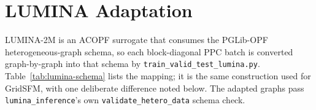 \documentclass[10pt]{article}
\begin{document}
\begin{table}[h!]
\centering
\caption{SimBench raw-parquet baseline metrics, complex128 residual evaluation.}
\label{tab:simbench-baseline}
\small
{}
\end{table}

\section*{LUMINA Adaptation}
LUMINA-2M is an ACOPF surrogate that consumes the PGLib-OPF heterogeneous-graph schema, so each block-diagonal PPC batch is converted graph-by-graph into that schema by \texttt{train\_valid\_test\_lumina.py}. Table~\ref{tab:lumina-schema} lists the mapping; it is the same construction used for GridSFM, with one deliberate difference noted below. The adapted graphs pass \texttt{lumina\_inference}'s own \texttt{validate\_hetero\_data} schema check.
\end{document}
